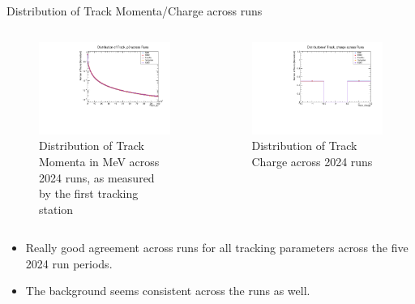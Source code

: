 \begin{frame}{Distribution of Track Momenta/Charge across runs}
	\begin{columns}
		\begin{column}{0.5\linewidth}
			\begin{figure}
				\includegraphics[width=\linewidth]{./RunwisePlots/Track_p0_runwise.pdf}
				\caption{Distribution of Track Momenta in MeV across 2024 runs, as measured by the first tracking station}
			\end{figure}
		\end{column}
		\begin{column}{0.5\linewidth}
			\begin{figure}
				\includegraphics[width=\linewidth]{./RunwisePlots/Track_charge_runwise.pdf}
				\caption{Distribution of Track Charge across 2024 runs}
			\end{figure}
		\end{column}
	\end{columns}
	\begin{itemize}
		\item Really good agreement across runs for all tracking parameters across the five 2024 run periods.
		\item The background seems consistent across the runs as well.
	\end{itemize}
\end{frame}

